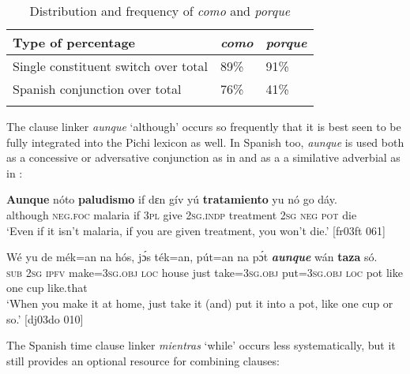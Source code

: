 \begin{table}
\caption{Distribution and frequency of \textit{como} and \textit{porque}}
\label{tab:key:13.3}

\begin{tabularx}{\textwidth}{lXX}
\lsptoprule

Type of percentage & \itshape como & \itshape porque\\
\midrule
Single constituent switch over total & 89\% & 91\%\\
Spanish conjunction over total & 76\% & 41\%\\
\lspbottomrule
\end{tabularx}
\end{table}
The clause linker\textit{ aunque} ‘although’ occurs so frequently that it is best seen to be fully integrated into the Pichi lexicon as well. In Spanish too, \textit{aunque} is used both as a concessive or adversative conjunction as in  and as a a similative adverbial as in : 

\ea%
    \label{ex:key:1727}
    \gll \textbf{Aunque}     nóto \textbf{paludismo} if  dɛn  gív  yú \textbf{tratamiento} yu  nó  go  dáy.\\
although    \textsc{neg}.\textsc{foc}  malaria    if  \textsc{3pl}  give  \textsc{2sg.indp}  treatment
\textsc{2sg}  \textsc{neg}  \textsc{pot}  die\\

\glt ‘Even if it isn’t malaria, if you are given treatment, you won’t die.’ [fr03ft 061]
\z


\ea%
    \label{ex:key:1728}
    \gll Wé  yu  de  mék=an    na  hós,    jɔ́s  ték=an,
pút=an    na  pɔ́t  \textbf{\textit{aunque}}  wán    \textbf{taza}  só.\\
\textsc{sub}  \textsc{2sg}  \textsc{ipfv}  make=\textsc{3sg.obj}  \textsc{loc}  house  just  take=\textsc{3sg.obj}
put=\textsc{3sg.obj}  \textsc{loc}  pot  like    one    cup  like.that\\

\glt ‘When you make it at home, just take it (and) put it into a pot, 
like one cup or so.’ [dj03do 010]
\z

The Spanish time clause linker \textit{mientras} ‘while’ occurs less systematically, but it still provides an optional resource for combining clauses: 


